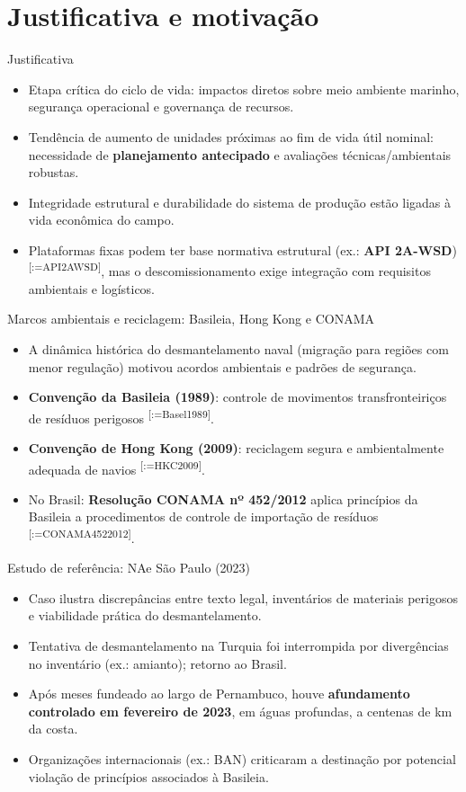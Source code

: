 \documentclass[aspectratio=169,11pt]{beamer}
\makeatletter
\renewcommand{\cite}[1]{\textsuperscript{[\@for\@tempa:=#1\do{\@tempa,}\@gobble]}}
\makeatother
\begin{document}
\section{Justificativa e motivação}

\begin{frame}{Justificativa}
\begin{itemize}
  \item Etapa crítica do ciclo de vida: impactos diretos sobre meio ambiente marinho, segurança operacional e governança de recursos.
  \item Tendência de aumento de unidades próximas ao fim de vida útil nominal: necessidade de \textbf{planejamento antecipado} e avaliações técnicas/ambientais robustas.
  \item Integridade estrutural e durabilidade do sistema de produção estão ligadas à vida econômica do campo.
  \item Plataformas fixas podem ter base normativa estrutural (ex.: \textbf{API 2A-WSD}) \cite{API2AWSD}, mas o descomissionamento exige integração com requisitos ambientais e logísticos.
\end{itemize}
\end{frame}

\begin{frame}{Marcos ambientais e reciclagem: Basileia, Hong Kong e CONAMA}
\begin{itemize}
  \item A dinâmica histórica do desmantelamento naval (migração para regiões com menor regulação) motivou acordos ambientais e padrões de segurança.
  \item \textbf{Convenção da Basileia (1989)}: controle de movimentos transfronteiriços de resíduos perigosos \cite{Basel1989}.
  \item \textbf{Convenção de Hong Kong (2009)}: reciclagem segura e ambientalmente adequada de navios \cite{HKC2009}.
  \item No Brasil: \textbf{Resolução CONAMA nº 452/2012} aplica princípios da Basileia a procedimentos de controle de importação de resíduos \cite{CONAMA4522012}.
\end{itemize}
\end{frame}

\begin{frame}{Estudo de referência: NAe São Paulo (2023)}
\small
\begin{itemize}
  \item Caso ilustra discrepâncias entre texto legal, inventários de materiais perigosos e viabilidade prática do desmantelamento.
  \item Tentativa de desmantelamento na Turquia foi interrompida por divergências no inventário (ex.: amianto); retorno ao Brasil.
  \item Após meses fundeado ao largo de Pernambuco, houve \textbf{afundamento controlado em fevereiro de 2023}, em águas profundas, a centenas de km da costa.
  \item Organizações internacionais (ex.: BAN) criticaram a destinação por potencial violação de princípios associados à Basileia.
\end{itemize}
\end{frame}
\end{document}
